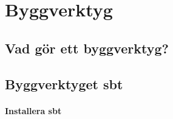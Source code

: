 
\chapter{Byggverktyg}

\section{Vad gör ett byggverktyg?}

\section{Byggverktyget sbt}

\subsubsection{Installera sbt}